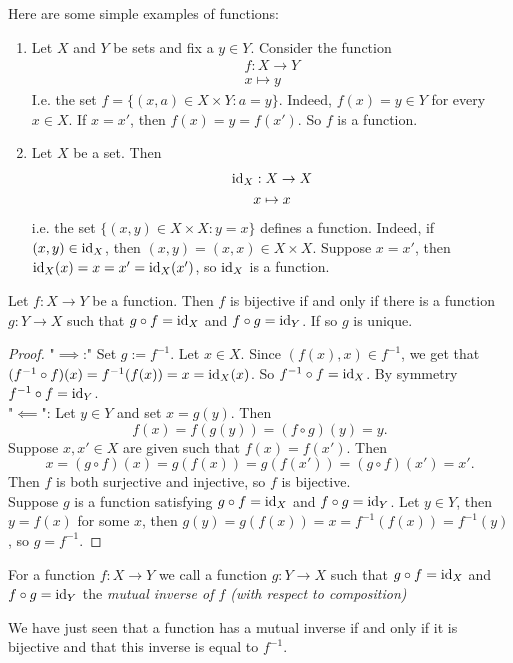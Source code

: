 \begin{example}
    Here are some simple examples of functions:
    \begin{enumerate}
        \item Let $X$ and $Y$ be sets and fix a $y\in Y$. Consider the function
        \begin{gather*}
            f : X\rightarrow Y\\
            x\mapsto y
        \end{gather*}
        I.e. the set $f=\{ (x,a)\in X\times Y : a=y\}$. Indeed, $f(x)=y\in Y$ for every $x\in X$. If $x=x'$, then $f(x)=y=f(x')$. So $f$ is a function.
        \item Let $X$ be a set. Then
        \begin{gather*}
            \mathrm{id}_X : X\rightarrow X\\
            x \mapsto x            
        \end{gather*}
        i.e. the set $\{(x,y)\in X\times X : y=x\}$ defines a function. Indeed, if $(x,y)\in \mathrm{id}_X$, then $(x,y)=(x,x)\in X\times X$. Suppose $x=x'$, then $\mathrm{id}_X(x)=x=x'=\mathrm{id}_X(x')$, so $\mathrm{id}_X$ is a function. 
    \end{enumerate}
\end{example}
\begin{lemma}
    Let $f: X\rightarrow Y$ be a function. Then $f$ is bijective if and only if there is a function $g: Y\rightarrow X$ such that $g\circ f =\mathrm{id}_X$ and $f\circ g= \mathrm{id}_Y$. If so $g$ is unique.
\end{lemma}
\begin{proof}
    "$\implies$:" Set $g:= f^{-1}$. Let $x\in X$. Since $(f(x),x)\in f^{-1}$, we get that $(f^{-1}\circ f)(x)=f^{-1}(f(x))= x = \mathrm{id}_X(x)$. So $f^{-1}\circ f = \mathrm{id}_X$. By symmetry $f^{-1}\circ f = \mathrm{id}_Y$.\\
    "$\impliedby$": Let $y\in Y$ and set $x= g(y)$. Then $$f(x)=f(g(y)) = (f\circ g)(y)= y.$$
    Suppose $x,x'\in X$ are given such that $f(x)=f(x')$. Then 
    $$x= (g\circ f)(x)=g(f(x))=g(f(x'))=(g\circ f)(x')=x'.$$
    Then $f$ is both surjective and injective, so $f$ is bijective.\\
    Suppose $g$ is a function satisfying $g\circ f =\mathrm{id}_X$ and $f\circ g= \mathrm{id}_Y$. Let $y\in Y$, then $y=f(x)$ for some $x$, then $g(y) = g(f(x))=x=f^{-1}(f(x))=f^{-1}(y)$, so $g=f^{-1}$. 
\end{proof}
\begin{definition}
    For a function $f : X\rightarrow Y$ we call a function $g: Y\rightarrow X$ such that $g\circ f =\mathrm{id}_X$ and $f\circ g= \mathrm{id}_Y$ the \textit{mutual inverse of $f$ (with respect to composition)}
\end{definition}
\begin{remark}
    We have just seen that a function has a mutual inverse if and only if it is bijective and that this inverse is equal to $f^{-1}$. 
\end{remark}
